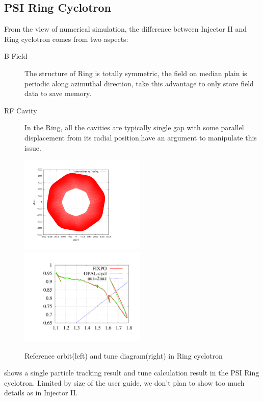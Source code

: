 \subsection{PSI Ring Cyclotron}
\label{sec:Ring}
From the view of numerical simulation, the difference between Injector II and Ring cyclotron comes from two aspects:
\begin{description}
\item[B Field] The structure of Ring is totally symmetric, the field on median plain is periodic
along azimuthal direction, \opalcycl take this advantage to only store  field data to save memory.

\item[RF Cavity] In the Ring, all the cavities are typically single gap with some parallel displacement from its
radial position.\opalcycl have an argument  to manipulate this issue.
\end{description}
\begin{figure}[ht]
  \begin{center}
    \includegraphics[width=6cm,trim=2.5cm 2.5cm 2.5cm 2.5cm]{figures/cyclotron/AEO_Ring.png}
    \includegraphics[width=6cm,trim=2.5cm 2.5cm 2.5cm 2.5cm]{figures/cyclotron/nurnuz_Ring}
    \caption{Reference orbit(left) and tune diagram(right) in Ring cyclotron }
    \label{fig:Ring reference orbit and tune}
  \end{center}
\end{figure}
 shows a single particle tracking result and tune calculation result in the PSI Ring cyclotron.
Limited by size of the user guide, we don't plan to show too much details as in Injector II.

